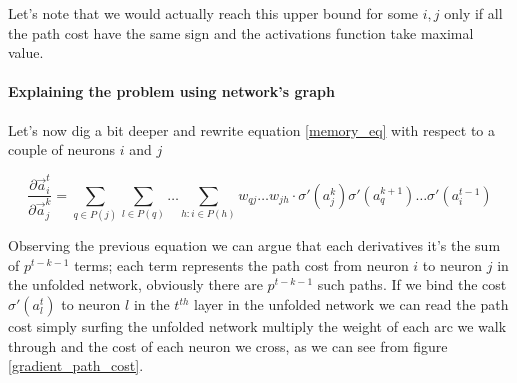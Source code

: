 Let's note that we would actually reach this upper bound for some $i,j$ only if all the path cost have the same sign and the activations function take maximal
value.


\paragraph{Explaining the problem using network's graph}
Let's now dig a bit deeper and rewrite equation \ref{memory_eq} with respect to a couple of neurons $i$ and $j$

\begin{equation} 
\frac{\partial \vec{a}_i^t}{\partial \vec{a}_j^k} = \sum_{q\in P(j)} \sum_{l \in P(q)} \hdots \sum_{h : i \in P(h)} w_{qj} \hdots w_{jh} \cdot \sigma'(a_j^k)\sigma'(a_q^{k+1}) \hdots \sigma'(a_i^{t-1})
\label{expanded_mem}
\end{equation}


Observing the previous equation we can argue that each derivatives it's the sum of $p^{t-k-1}$ terms; each term represents the path cost from neuron $i$ to neuron $j$ in the unfolded network, obviously
there are $p^{t-k-1}$ such paths. If we bind the cost $\sigma'(a_l^t)$ to neuron $l$ in the $t^{th}$ layer in the unfolded network we can read the path cost simply surfing the unfolded network multiply
the weight of each arc we walk through and the cost of each neuron we cross, as we can see from figure \ref{gradient_path_cost}.


